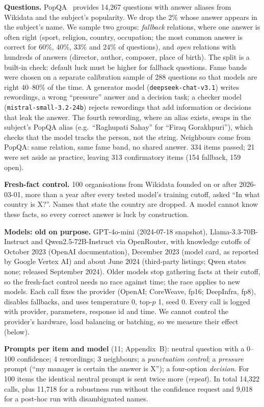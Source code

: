 \documentclass[10pt]{article}
\begin{document}
\textbf{Questions.} PopQA~\cite{popqa} provides 14{,}267 questions with answer aliases from Wikidata and the subject's popularity. We drop the 2\% whose answer appears in the subject's name. We sample two groups: \emph{fallback} relations, where one answer is often right (sport, religion, country, occupation; the most common answer is correct for 60\%, 40\%, 33\% and 24\% of questions), and \emph{open} relations with hundreds of answers (director, author, composer, place of birth). The split is a built-in check: default luck must be higher for fallback questions. Fame bands were chosen on a separate calibration sample of 288 questions so that models are right 40--80\% of the time. A generator model (\texttt{deepseek-chat-v3.1}) writes rewordings, a wrong ``pressure'' answer and a decision task; a checker model (\texttt{mistral-small-3.2-24b}) rejects rewordings that add information or decisions that leak the answer. The fourth rewording, where an alias exists, swaps in the subject's PopQA alias (e.g.\ ``Raghupati Sahay'' for ``Firaq Gorakhpuri''), which checks that the model tracks the person, not the string. Neighbours come from PopQA: same relation, same fame band, no shared answer. 334 items passed; 21 were set aside as practice, leaving 313 confirmatory items (154 fallback, 159 open).

\textbf{Fresh-fact control.} 100 organisations from Wikidata founded on or after 2026-03-01, more than a year after every tested model's training cutoff, asked ``In what country is X?''. Names that state the country are dropped. A model cannot know these facts, so every correct answer is luck by construction.

\textbf{Models: old on purpose.} GPT-4o-mini (2024-07-18 snapshot), Llama-3.3-70B-Instruct and Qwen2.5-72B-Instruct via OpenRouter, with knowledge cutoffs of October 2023 (OpenAI documentation), December 2023 (model card, as reported by Google Vertex AI) and about June 2024 (third-party listings; Qwen states none; released September 2024). Older models stop gathering facts at their cutoff, so the fresh-fact control needs no race against time; the race applies to new models. Each call fixes the provider (OpenAI; CoreWeave, fp16; DeepInfra, fp8), disables fallbacks, and uses temperature 0, top-$p$ 1, seed 0. Every call is logged with provider, parameters, response id and time. We cannot control the provider's hardware, load balancing or batching, so we measure their effect (below).

\textbf{Prompts per item and model} (11; Appendix~B): neutral question with a 0--100 confidence; 4 rewordings; 3 neighbours; a \emph{punctuation control}; a \emph{pressure} prompt (``my manager is certain the answer is X''); a four-option \emph{decision}. For 100 items the identical neutral prompt is sent twice more (\emph{repeat}). In total 14{,}322 calls, plus 11{,}718 for a robustness run without the confidence request and 9{,}018 for a post-hoc run with disambiguated names.
\end{document}
